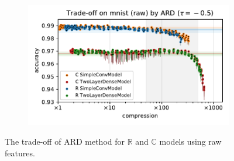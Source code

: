 \documentclass[a4paper,10pt,onecolumn]{article}
\newcommand{\real}{\mathbb{R}}
\newcommand{\cplx}{\mathbb{C}}
\begin{document}
\begin{figure}[b]
\begin{subfigure}[b]{0.5\columnwidth}
  \end{subfigure}%
  \begin{subfigure}[b]{0.5\columnwidth}
    \centering
    \includegraphics[width=\linewidth]{figure__mnist-like__trade-off/appendix__ARD__mnist__raw__-0.5.pdf}
  \end{subfigure}
  \caption{%
    The trade-off of ARD method for $\real$ and $\cplx$ models using raw features.
  }
  \label{fig:appendix__mnist-like__trade-off__ARD__raw}
\end{figure}
\end{document}

